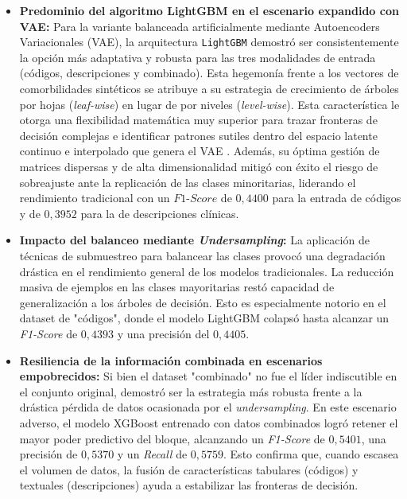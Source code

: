 \documentclass[12pt,a4paper,onecolumn,oneside]{report}
\begin{document}
\begin{itemize}
    \item \textbf{Predominio del algoritmo LightGBM en el escenario expandido con VAE:} Para la variante balanceada artificialmente mediante Autoencoders Variacionales (VAE), la arquitectura \texttt{LightGBM} demostró ser consistentemente la opción más adaptativa y robusta para las tres modalidades de entrada (códigos, descripciones y combinado). Esta hegemonía frente a los vectores de comorbilidades sintéticos se atribuye a su estrategia de crecimiento de árboles por hojas (\textit{leaf-wise}) en lugar de por niveles (\textit{level-wise}). Esta característica le otorga una flexibilidad matemática muy superior para trazar fronteras de decisión complejas e identificar patrones sutiles dentro del espacio latente continuo e interpolado que genera el VAE . Además, su óptima gestión de matrices dispersas y de alta dimensionalidad mitigó con éxito el riesgo de sobreajuste ante la replicación de las clases minoritarias, liderando el rendimiento tradicional con un $F1\text{-}Score$ de $0,4400$ para la entrada de códigos y de $0,3952$ para la de descripciones clínicas.
    
    \item \textbf{Impacto del balanceo mediante \textit{Undersampling}:} La aplicación de técnicas de submuestreo para balancear las clases provocó una degradación drástica en el rendimiento general de los modelos tradicionales. La reducción masiva de ejemplos en las clases mayoritarias restó capacidad de generalización a los árboles de decisión. Esto es especialmente notorio en el dataset de "códigos", donde el modelo LightGBM colapsó hasta alcanzar un \textit{F1-Score} de $0,4393$ y una precisión del $0,4405$.
    
    \item \textbf{Resiliencia de la información combinada en escenarios empobrecidos:} Si bien el dataset "combinado" no fue el líder indiscutible en el conjunto original, demostró ser la estrategia más robusta frente a la drástica pérdida de datos ocasionada por el \textit{undersampling}. En este escenario adverso, el modelo XGBoost entrenado con datos combinados logró retener el mayor poder predictivo del bloque, alcanzando un \textit{F1-Score} de $0,5401$, una precisión de $0,5370$ y un \textit{Recall} de $0,5759$. Esto confirma que, cuando escasea el volumen de datos, la fusión de características tabulares (códigos) y textuales (descripciones) ayuda a estabilizar las fronteras de decisión.
\end{itemize}
\end{document}
